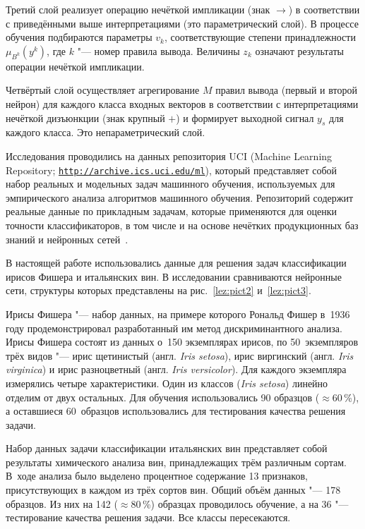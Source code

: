 Третий слой реализует операцию нечёткой импликации (знак $\to$) в
соответствии с приведёнными выше интерпретациями (это параметрический слой).
В процессе обучения подбираются параметры $v_k$, соответствующие степени
принадлежности $\mu_{B^k} ( y^k)$, где $k$ "---  номер
правила вывода. Величины $z_k$ означают результаты операции нечёткой
импликации.

Четвёртый слой осуществляет агрегирование $M$ правил вывода (первый и второй
нейрон) для каждого класса входных векторов в соответствии с интерпретациями
нечёткой дизъюнкции (знак крупный $+$) и формирует выходной сигнал $y_s$ для
каждого класса. Это непараметрический слой.

Исследования проводились на данных репозитория UCI (Machine Learning
Repository; {\tt \url{http://archive.ics.uci.edu/ml}}), который представляет собой набор реальных и модельных задач
машинного обучения, используемых для эмпирического анализа алгоритмов
машинного обучения. 
Репозиторий содержит реальные данные по прикладным
задачам, которые применяются для оценки точности классификаторов, в том
числе и на основе нечётких продукционных баз знаний и нейронных сетей~\cite{soldat:bib7,soldat:bib8}.

В настоящей работе использовались данные для решения задач классификации ирисов
Фишера и итальянских вин. В исследовании сравниваются нейронные сети,
структуры которых представлены на рис.~\ref{lez:pict2} и~\ref{lez:pict3}.

Ирисы Фишера "--- набор данных, на примере которого Рональд Фишер в~1936 году продемонстрировал разработанный им метод дискриминантного анализа. 
Ирисы Фишера состоят из данных о~150 экземплярах ирисов, по 50~экземпляров трёх видов "--- ирис щетинистый (англ. \textit{Iris setosa}), ирис виргинский (англ. \textit{Iris virginica}) и ирис разноцветный (англ. \textit{Iris versicolor}). 
Для каждого экземпляра измерялись четыре характеристики. Один из классов (\textit{Iris setosa}) линейно отделим от двух остальных. 
Для обучения использовались 90 образцов ($\approx 60$\,{\%}), а оставшиеся 60~образцов использовались для тестирования качества решения задачи.

Набор данных задачи классификации итальянских вин представляет собой результаты химического анализа вин, принадлежащих трём различным сортам. 
В~ходе анализа было выделено процентное содержание 13 признаков, присутствующих в каждом из трёх сортов вин. Общий объём данных "--- 178 образцов. 
Из них на 142 ($\approx 80$\,{\%}) образцах проводилось обучение, а на 36 "--- тестирование качества решения задачи. Все классы пересекаются.

